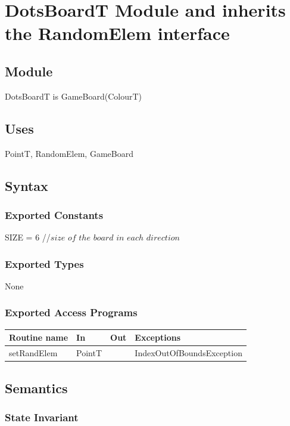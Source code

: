 \documentclass[12pt]{article}
\begin{document}
\newpage

\section* {DotsBoardT Module and inherits the RandomElem interface}

\subsection*{Module}

DotsBoardT is GameBoard(ColourT)

\subsection* {Uses}

PointT, RandomElem, GameBoard

\subsection* {Syntax}

\subsubsection* {Exported Constants}

SIZE = 6 //$size$ $of$ $the$ $board$ $in$ $each$ $direction$ 

\subsubsection* {Exported Types}

None
\subsubsection* {Exported Access Programs}

\begin{tabular}{| l | l | l | p{5.5cm} |}
\hline
\textbf{Routine name} & \textbf{In} & \textbf{Out} & \textbf{Exceptions}\\
\hline
setRandElem& PointT & & IndexOutOfBoundsException\\
\hline
\end{tabular}

\subsection* {Semantics}

\subsubsection* {State Invariant}
\end{document}
